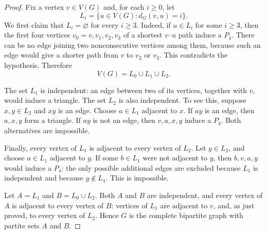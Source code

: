 \documentclass[12pt]{amsart}
\theoremstyle{conjecture}
\theoremstyle{definition}
\theoremstyle{question}
\theoremstyle{theorem}
\begin{document}
    \begin{proof}
        Fix a vertex $v\in V(G)$ and, for each $i\geq 0$, let
        \[
            L_i=\{u\in V(G):d_G(v,u)=i\}.
        \]
        We first claim that $L_i=\varnothing$ for every $i\geq 3$.  Indeed, if
        $u\in L_i$ for some $i\geq 3$, then the first four vertices
        $v_0=v,v_1,v_2,v_3$ of a shortest $v$--$u$ path induce a $P_4$.
        There can be no edge joining two nonconsecutive vertices among them,
        because such an edge would give a shorter path from $v$ to $v_2$ or
        $v_3$.  This contradicts the hypothesis.  Therefore
        \[
            V(G)=L_0\cup L_1\cup L_2.
        \]

        The set $L_1$ is independent: an edge between two of its vertices,
        together with $v$, would induce a triangle.  The set $L_2$ is also
        independent.  To see this, suppose $x,y\in L_2$ and $xy$ is an edge.
        Choose $a\in L_1$ adjacent to $x$.  If $ay$ is an edge, then
        $a,x,y$ form a triangle.  If $ay$ is not an edge, then
        $v,a,x,y$ induce a $P_4$.  Both alternatives are impossible.

        Finally, every vertex of $L_1$ is adjacent to every vertex of $L_2$.
        Let $y\in L_2$, and choose $a\in L_1$ adjacent to $y$.  If some
        $b\in L_1$ were not adjacent to $y$, then $b,v,a,y$ would induce a
        $P_4$: the only possible additional edges are excluded because $L_1$
        is independent and because $y\notin L_1$.  This is impossible.

        Let $A=L_1$ and $B=L_0\cup L_2$.  Both $A$ and $B$ are independent,
        and every vertex of $A$ is adjacent to every vertex of $B$: vertices
        of $L_1$ are adjacent to $v$, and, as just proved, to every vertex of
        $L_2$.  Hence $G$ is the complete bipartite graph with partite sets
        $A$ and $B$.
    \end{proof}
\end{document}
